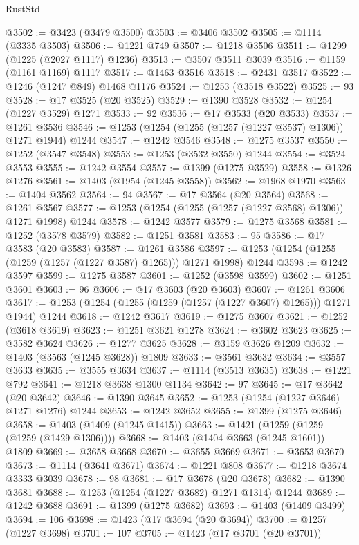 \begin{lexlean}{RustStd}
\begin{coremodule}
@3502 := @3423 (@3479 @3500)
@3503 := @3406 @3502
@3505 := @1114 (@3335 @3503)
@3506 := @1221 @749
@3507 := @1218 @3506
@3511 := @1299 (@1225 (@2027 @1117) @1236)
@3513 := @3507 @3511 @3039
@3516 := @1159 (@1161 @1169) @1117
@3517 := @1463 @3516
@3518 := @2431 @3517
@3522 := @1246 (@1247 @849) @1468 @1176
@3524 := @1253 (@3518 @3522)
@3525 := 93
@3528 := @17 @3525 (@20 @3525)
@3529 := @1390 @3528
@3532 := @1254 (@1227 @3529) @1271
@3533 := 92
@3536 := @17 @3533 (@20 @3533)
@3537 := @1261 @3536
@3546 := @1253 (@1254 (@1255 (@1257 (@1227 @3537) @1306)) @1271 @1944) @1244
@3547 := @1242 @3546
@3548 := @1275 @3537
@3550 := @1252 (@3547 @3548)
@3553 := @1253 (@3532 @3550) @1244
@3554 := @3524 @3553
@3555 := @1242 @3554
@3557 := @1399 (@1275 @3529)
@3558 := @1326 @1276
@3561 := @1403 (@1954 (@1245 @3558))
@3562 := @1968 @1970
@3563 := @1404 @3562
@3564 := 94
@3567 := @17 @3564 (@20 @3564)
@3568 := @1261 @3567
@3577 := @1253 (@1254 (@1255 (@1257 (@1227 @3568) @1306)) @1271 @1998) @1244
@3578 := @1242 @3577
@3579 := @1275 @3568
@3581 := @1252 (@3578 @3579)
@3582 := @1251 @3581
@3583 := 95
@3586 := @17 @3583 (@20 @3583)
@3587 := @1261 @3586
@3597 := @1253 (@1254 (@1255 (@1259 (@1257 (@1227 @3587) @1265))) @1271 @1998) @1244
@3598 := @1242 @3597
@3599 := @1275 @3587
@3601 := @1252 (@3598 @3599)
@3602 := @1251 @3601
@3603 := 96
@3606 := @17 @3603 (@20 @3603)
@3607 := @1261 @3606
@3617 := @1253 (@1254 (@1255 (@1259 (@1257 (@1227 @3607) @1265))) @1271 @1944) @1244
@3618 := @1242 @3617
@3619 := @1275 @3607
@3621 := @1252 (@3618 @3619)
@3623 := @1251 @3621 @1278
@3624 := @3602 @3623
@3625 := @3582 @3624
@3626 := @1277 @3625
@3628 := @3159 @3626 @1209
@3632 := @1403 (@3563 (@1245 @3628)) @1809
@3633 := @3561 @3632
@3634 := @3557 @3633
@3635 := @3555 @3634
@3637 := @1114 (@3513 @3635)
@3638 := @1221 @792
@3641 := @1218 @3638 @1300 @1134
@3642 := 97
@3645 := @17 @3642 (@20 @3642)
@3646 := @1390 @3645
@3652 := @1253 (@1254 (@1227 @3646) @1271 @1276) @1244
@3653 := @1242 @3652
@3655 := @1399 (@1275 @3646)
@3658 := @1403 (@1409 (@1245 @1415))
@3663 := @1421 (@1259 (@1259 (@1259 (@1429 @1306))))
@3668 := @1403 (@1404 @3663 (@1245 @1601)) @1809
@3669 := @3658 @3668
@3670 := @3655 @3669
@3671 := @3653 @3670
@3673 := @1114 (@3641 @3671)
@3674 := @1221 @808
@3677 := @1218 @3674 @3333 @3039
@3678 := 98
@3681 := @17 @3678 (@20 @3678)
@3682 := @1390 @3681
@3688 := @1253 (@1254 (@1227 @3682) @1271 @1314) @1244
@3689 := @1242 @3688
@3691 := @1399 (@1275 @3682)
@3693 := @1403 (@1409 @3499)
@3694 := 106
@3698 := @1423 (@17 @3694 (@20 @3694))
@3700 := @1257 (@1227 @3698)
@3701 := 107
@3705 := @1423 (@17 @3701 (@20 @3701))

\end{coremodule}
\end{lexlean}
